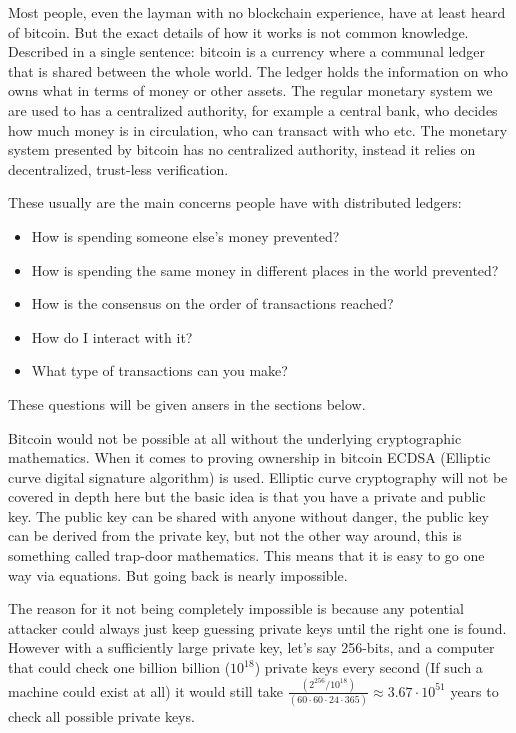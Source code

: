 Most people, even the layman with no blockchain experience, have at least heard
of bitcoin. But the exact details of how it works is not common knowledge.
Described in a single sentence: bitcoin is a currency where a communal ledger
that is shared between the whole world. The ledger holds the information on who
owns what in terms of money or other assets. The regular monetary system we are
used to has a centralized authority, for example a central bank, who decides
how much money is in circulation, who can transact with who etc. The monetary
system presented by bitcoin has no centralized authority, instead it relies on
decentralized, trust-less verification.

These usually are the main concerns people have with distributed ledgers:
\begin{itemize}
	\item How is spending someone else's money prevented?
	\item How is spending the same money in different places in the world prevented?
	\item How is the consensus on the order of transactions reached?
	\item How do I interact with it?
	\item What type of transactions can you make?
\end{itemize}

These questions will be given ansers in the sections below.

Bitcoin would not be possible at all without the underlying cryptographic
mathematics. When it comes to proving ownership in bitcoin ECDSA (Elliptic curve
digital signature algorithm)\cite{ecc_def} is used. Elliptic curve cryptography
will not be covered in depth here but the basic idea is that you have a private
and public key. The public key can be shared with anyone without danger, the
public key can be derived from the private key, but not the other way around,
this is something called trap-door mathematics.\cite{ecc_def}\cite{antonopoulos_2017}
This means that it is easy to go one way via equations. But going back is
nearly impossible.

The reason for it not being completely impossible is because any potential
attacker could always just keep guessing private keys until the right one is
found. However with a sufficiently large private key, let's say 256-bits, and a
computer that could check one billion billion ($10^{18}$) private keys every
second (If such a machine could exist at all) it would still take
$\frac{(2^{256} / 10^{18})}{(60\cdot60\cdot24\cdot365)}\approx3.67\cdot10^{51}$
years to check all possible private keys.

